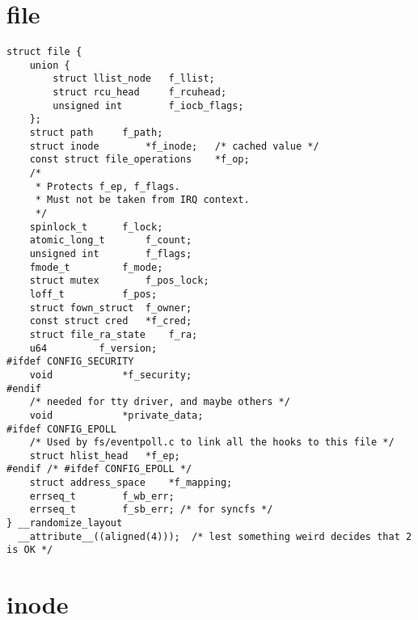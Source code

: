 \section{file}

\begin{lstlisting}
struct file {
	union {
		struct llist_node	f_llist;
		struct rcu_head 	f_rcuhead;
		unsigned int 		f_iocb_flags;
	};
	struct path		f_path;
	struct inode		*f_inode;	/* cached value */
	const struct file_operations	*f_op;
	/*
	 * Protects f_ep, f_flags.
	 * Must not be taken from IRQ context.
	 */
	spinlock_t		f_lock;
	atomic_long_t		f_count;
	unsigned int 		f_flags;
	fmode_t			f_mode;
	struct mutex		f_pos_lock;
	loff_t			f_pos;
	struct fown_struct	f_owner;
	const struct cred	*f_cred;
	struct file_ra_state	f_ra;
	u64			f_version;
#ifdef CONFIG_SECURITY
	void			*f_security;
#endif
	/* needed for tty driver, and maybe others */
	void			*private_data;
#ifdef CONFIG_EPOLL
	/* Used by fs/eventpoll.c to link all the hooks to this file */
	struct hlist_head	*f_ep;
#endif /* #ifdef CONFIG_EPOLL */
	struct address_space	*f_mapping;
	errseq_t		f_wb_err;
	errseq_t		f_sb_err; /* for syncfs */
} __randomize_layout
  __attribute__((aligned(4)));	/* lest something weird decides that 2 is OK */
\end{lstlisting}

\section{inode}

